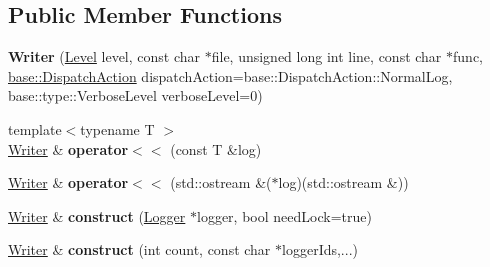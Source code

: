 \subsection*{Public Member Functions}
\begin{DoxyCompactItemize}
\item 
{\bfseries Writer} (\hyperlink{namespaceel_ab0ac6091262344c52dd2d3ad099e8e36}{Level} level, const char $\ast$file, unsigned long int line, const char $\ast$func, \hyperlink{namespaceel_1_1base_a3aa2563d38e47388ba242a1694fc2839}{base\+::\+Dispatch\+Action} dispatch\+Action=base\+::\+Dispatch\+Action\+::\+Normal\+Log, base\+::type\+::\+Verbose\+Level verbose\+Level=0)\hypertarget{classel_1_1base_1_1Writer_ac2a835925f37fd2ca3da00998d8a533c}{}\label{classel_1_1base_1_1Writer_ac2a835925f37fd2ca3da00998d8a533c}

\item 
{\footnotesize template$<$typename T $>$ }\\\hyperlink{classel_1_1base_1_1Writer}{Writer} \& {\bfseries operator$<$$<$} (const T \&log)\hypertarget{classel_1_1base_1_1Writer_ab94f0d920c6465a57937e893aa9f5ada}{}\label{classel_1_1base_1_1Writer_ab94f0d920c6465a57937e893aa9f5ada}

\item 
\hyperlink{classel_1_1base_1_1Writer}{Writer} \& {\bfseries operator$<$$<$} (std\+::ostream \&($\ast$log)(std\+::ostream \&))\hypertarget{classel_1_1base_1_1Writer_aea6d7f996ff92e9485a76ad3955f0a29}{}\label{classel_1_1base_1_1Writer_aea6d7f996ff92e9485a76ad3955f0a29}

\item 
\hyperlink{classel_1_1base_1_1Writer}{Writer} \& {\bfseries construct} (\hyperlink{classel_1_1Logger}{Logger} $\ast$logger, bool need\+Lock=true)\hypertarget{classel_1_1base_1_1Writer_a282d82f392a3e6fef9eda47ce53e87dc}{}\label{classel_1_1base_1_1Writer_a282d82f392a3e6fef9eda47ce53e87dc}

\item 
\hyperlink{classel_1_1base_1_1Writer}{Writer} \& {\bfseries construct} (int count, const char $\ast$logger\+Ids,...)\hypertarget{classel_1_1base_1_1Writer_ab2bc960787eb3c9b01569629dcbeb246}{}\label{classel_1_1base_1_1Writer_ab2bc960787eb3c9b01569629dcbeb246}

\end{DoxyCompactItemize}

